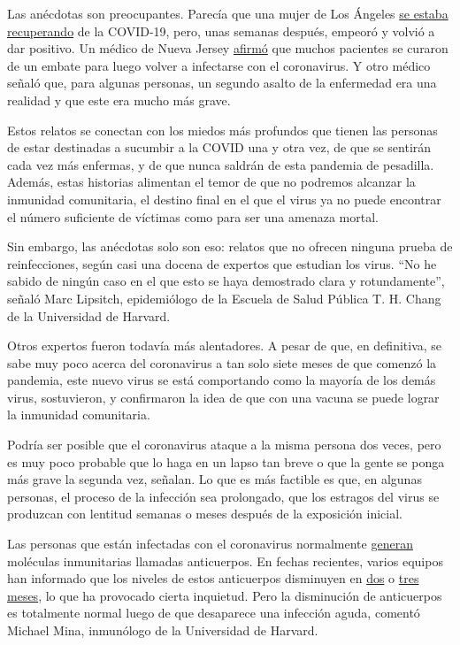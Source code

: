 Las anécdotas son preocupantes. Parecía que una mujer de Los Ángeles
\href{https://www.foxla.com/news/southern-california-woman-tests-positive-for-covid-19-for-second-time-after-initial-recovery}{se
estaba recuperando} de la COVID-19, pero, unas semanas después, empeoró
y volvió a dar positivo. Un médico de Nueva Jersey
\href{https://dailyvoice.com/new-jersey/monmouth/news/central-jersey-doctor-reports-patients-reinfected-with-coronavirus/790555/}{afirmó}
que muchos pacientes se curaron de un embate para luego volver a
infectarse con el coronavirus. Y otro médico señaló que, para algunas
personas, un segundo asalto de la enfermedad era una realidad y que este
era mucho más grave.

Estos relatos se conectan con los miedos más profundos que tienen las
personas de estar destinadas a sucumbir a la COVID una y otra vez, de
que se sentirán cada vez más enfermas, y de que nunca saldrán de esta
pandemia de pesadilla. Además, estas historias alimentan el temor de que
no podremos alcanzar la inmunidad comunitaria, el destino final en el
que el virus ya no puede encontrar el número suficiente de víctimas como
para ser una amenaza mortal.

Sin embargo, las anécdotas solo son eso: relatos que no ofrecen ninguna
prueba de reinfecciones, según casi una docena de expertos que estudian
los virus. ``No he sabido de ningún caso en el que esto se haya
demostrado clara y rotundamente'', señaló Marc Lipsitch, epidemiólogo de
la Escuela de Salud Pública T. H. Chang de la Universidad de Harvard.

Otros expertos fueron todavía más alentadores. A pesar de que, en
definitiva, se sabe muy poco acerca del coronavirus a tan solo siete
meses de que comenzó la pandemia, este nuevo virus se está comportando
como la mayoría de los demás virus, sostuvieron, y confirmaron la idea
de que con una vacuna se puede lograr la inmunidad comunitaria.

Podría ser posible que el coronavirus ataque a la misma persona dos
veces, pero es muy poco probable que lo haga en un lapso tan breve o que
la gente se ponga más grave la segunda vez, señalan. Lo que es más
factible es que, en algunas personas, el proceso de la infección sea
prolongado, que los estragos del virus se produzcan con lentitud semanas
o meses después de la exposición inicial.

Las personas que están infectadas con el coronavirus normalmente
\href{https://www.nature.com/articles/s41586-020-2456-9}{generan}
moléculas inmunitarias llamadas anticuerpos. En fechas recientes, varios
equipos han informado que los niveles de estos anticuerpos disminuyen en
\href{https://www.medrxiv.org/content/10.1101/2020.07.09.20149633v1?\%253fcollection=}{dos}
o \href{https://www.nature.com/articles/s41591-020-0965-6}{tres meses},
lo que ha provocado cierta inquietud. Pero la disminución de anticuerpos
es totalmente normal luego de que desaparece una infección aguda,
comentó Michael Mina, inmunólogo de la Universidad de Harvard.

